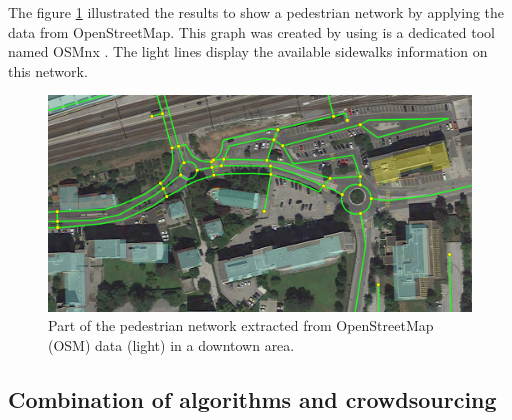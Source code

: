 \documentclass[10pt,conference,a4paper]{IEEEtran}
\begin{document}

The figure \ref{pedestriangraph} illustrated the results to show a pedestrian network by applying the data from OpenStreetMap. This graph was created by using is a dedicated tool named OSMnx \cite{boeing_osmnx:_2017}. The light lines display the available sidewalks information on this network. 

\begin{figure}[ht]
\begin{center}
\includegraphics[width=1.0\linewidth]{OSM_walk_graph_022.jpg}
\end{center}
   \caption{Part of the pedestrian network extracted from OpenStreetMap (OSM) data (light) in a downtown area.}\label{pedestriangraph}
\end{figure}


\subsection{Combination of algorithms and crowdsourcing}
\end{document}

